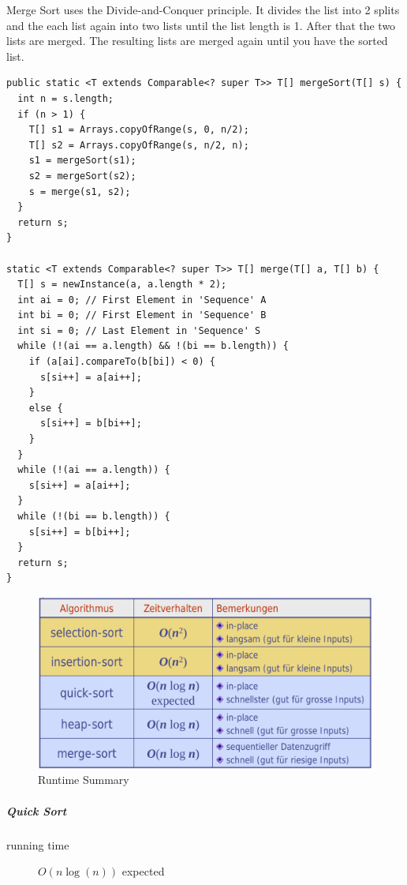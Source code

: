 \documentclass[11pt,twoside,twocolumn,landscape]{article}
\begin{document}
Merge Sort uses the Divide-and-Conquer principle.
It divides the list into 2 splits and the each list again into two lists until the list length is 1.
After that the two lists are merged.
The resulting lists are merged again until you have the sorted list.
\lstset{language=java,label= ,caption= ,captionpos=b,numbers=none}
\begin{lstlisting}
public static <T extends Comparable<? super T>> T[] mergeSort(T[] s) {  
  int n = s.length;
  if (n > 1) {
    T[] s1 = Arrays.copyOfRange(s, 0, n/2);
    T[] s2 = Arrays.copyOfRange(s, n/2, n);
    s1 = mergeSort(s1);
    s2 = mergeSort(s2);
    s = merge(s1, s2);
  }
  return s;
}

static <T extends Comparable<? super T>> T[] merge(T[] a, T[] b) {
  T[] s = newInstance(a, a.length * 2);
  int ai = 0; // First Element in 'Sequence' A
  int bi = 0; // First Element in 'Sequence' B
  int si = 0; // Last Element in 'Sequence' S
  while (!(ai == a.length) && !(bi == b.length)) {
    if (a[ai].compareTo(b[bi]) < 0) {
      s[si++] = a[ai++];
    }
    else {
      s[si++] = b[bi++];
    }
  }
  while (!(ai == a.length)) {
    s[si++] = a[ai++];
  }
  while (!(bi == b.length)) {
    s[si++] = b[bi++];
  }
  return s;
}
\end{lstlisting}

\begin{figure}[htbp]
\centering
\includegraphics[width=.9\linewidth]{img/sort_algorithm_summary_runtime.png}
\caption{\label{fig:orgec6ec7f}Runtime Summary}
\end{figure}

\subparagraph{Quick Sort}
\label{sec:org8c5be86}

\begin{description}
\item[{running time}] \(O(n \log(n))\) expected
\end{description}
\end{document}
